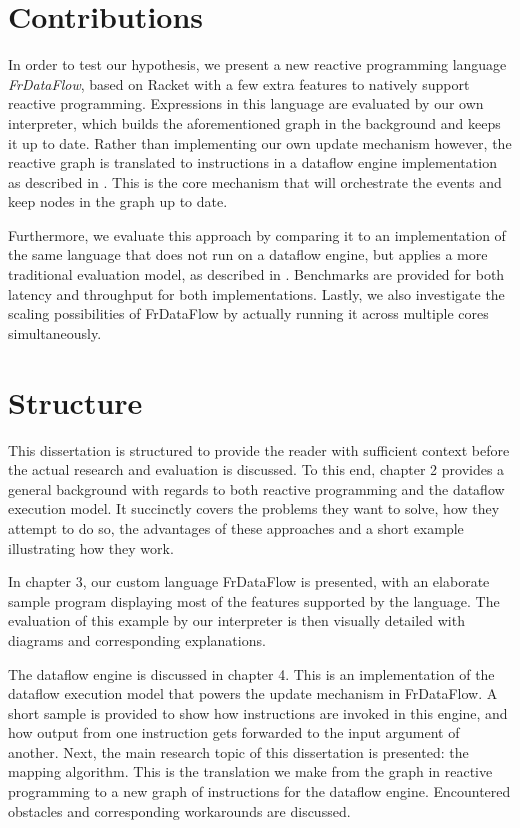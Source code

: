 \section{Contributions}

In order to test our hypothesis, we present a new reactive programming language \textit{FrDataFlow}, based on Racket with a few extra features to natively support reactive programming. Expressions in this language are evaluated by our own interpreter, which builds the aforementioned graph in the background and keeps it up to date. Rather than implementing our own update mechanism however, the reactive graph is translated to instructions in a dataflow engine implementation as described in \cite{saey_extensible_2017}. This is the core mechanism that will orchestrate the events and keep nodes in the graph up to date.

Furthermore, we evaluate this approach by comparing it to an implementation of the same language that does not run on a dataflow engine, but applies a more traditional evaluation model, as described in \cite{cooper_embedding_2006}. Benchmarks are provided for both latency and throughput for both implementations. Lastly, we also investigate the scaling possibilities of FrDataFlow by actually running it across multiple cores simultaneously. 

\section{Structure}

This dissertation is structured to provide the reader with sufficient context before the actual research and evaluation is discussed. To this end, chapter 2 provides a general background with regards to both reactive programming and the dataflow execution model. It succinctly covers the problems they want to solve, how they attempt to do so, the advantages of these approaches and a short example illustrating how they work.

In chapter 3, our custom language FrDataFlow is presented, with an elaborate sample program displaying most of the features supported by the language. The evaluation of this example by our interpreter is then visually detailed with diagrams and corresponding explanations. 

The dataflow engine is discussed in chapter 4. This is an implementation of the dataflow execution model that powers the update mechanism in FrDataFlow. A short sample is provided to show how instructions are invoked in this engine, and how output from one instruction gets forwarded to the input argument of another. Next, the main research topic of this dissertation is presented: the mapping algorithm. This is the translation we make from the graph in reactive programming to a new graph of instructions for the dataflow engine. Encountered obstacles and corresponding workarounds are discussed.

